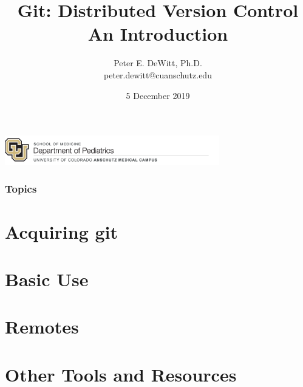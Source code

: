 \documentclass{beamer}
\author[Peter E. DeWitt]{Peter E. DeWitt, Ph.D.\inst{1} \\ peter.dewitt@cuanschutz.edu}
\institute[]{SOM | Department of Pediatrics | Informatics and Data Science}
\title[Intro to Git]{Git: Distributed Version Control \\ {\small An Introduction}}
\date{5 December 2019}
\begin{document}
  \begin{frame}[t,plain]
    \titlepage
    \includegraphics[width=0.7\textwidth]{som_pediatrics}
  \end{frame}

  \begin{frame}[t]
    \frametitle{Topics}
    \tableofcontents[hideallsubsections]
  \end{frame}

 

 \section{Acquiring git}
  \begin{frame}
    \frametitle{}
  \end{frame}

 \section{Basic Use}
  \begin{frame}
    \frametitle{}
  \end{frame}

 \section{Remotes}
  \begin{frame}
    \frametitle{}
  \end{frame}

 \section{Other Tools and Resources}
  \begin{frame}
    \frametitle{}
  \end{frame}
\end{document}
